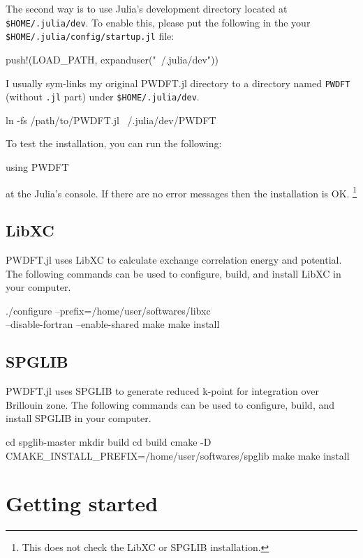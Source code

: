 \documentclass[a4paper,10pt,twocolumn]{paper}
\begin{document}
The second way is to use Julia's development directory located at
\texttt{\$HOME/.julia/dev}.
To enable this, please put the following in the
your \texttt{\$HOME/.julia/config/startup.jl} file:
\begin{juliacode}
push!(LOAD_PATH, expanduser("~/.julia/dev"))
\end{juliacode}
I usually sym-links my original \textsf{PWDFT.jl} directory
to a directory named \texttt{PWDFT} (without \texttt{.jl} part)
under \texttt{\$HOME/.julia/dev}.
\begin{textcode}
ln -fs /path/to/PWDFT.jl ~/.julia/dev/PWDFT
\end{textcode}

To test the installation, you can run the following:
\begin{juliacode}
using PWDFT
\end{juliacode}
at the Julia's console.
If there are no error messages then the installation is OK.
\footnote{This does not check the LibXC or SPGLIB installation.}

\subsection{LibXC}

\textsf{PWDFT.jl} uses LibXC to calculate exchange correlation energy
and potential.
The following commands can be used to configure, build, and install LibXC
in your computer.
\begin{textcode}
./configure --prefix=/home/user/softwares/libxc \\
  --disable-fortran --enable-shared
make
make install
\end{textcode}

\subsection{SPGLIB}

\textsf{PWDFT.jl} uses SPGLIB to generate reduced k-point for integration
over Brillouin zone.
The following commands can be used to configure, build, and install SPGLIB
in your computer.
\begin{textcode}
cd spglib-master
mkdir build
cd build
cmake -D CMAKE_INSTALL_PREFIX=/home/user/softwares/spglib
make
make install
\end{textcode}


\section{Getting started}
\end{document}
